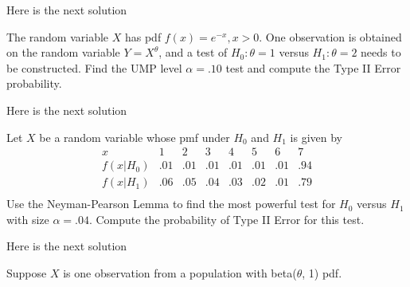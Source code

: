 \documentclass[12pt,letterpaper]{exam}
\begin{document}
\begin{questions}
	\begin{solution}
		Here is the next solution
	\end{solution}
	
	\setcounter{question}{19-1}
	
	\question 
	The random variable $X$ has pdf $f(x) = e^{-x}, x> 0$. 
	One observation is obtained on the random variable $Y = X^\theta$, 
	and a test of $H_0: \theta = 1$ versus $H_1: \theta = 2$ needs to be constructed. 
	Find the UMP level $\alpha = .10$ test and compute the Type II Error probability.

	\begin{solution}
		Here is the next solution
	\end{solution}
	
	\setcounter{question}{20-1}
	
	\question 
	Let $X$ be a random variable whose pmf under $H_0$ and $H_1$ is given by
	$$
	\begin{array}{cccccccc}
		x & 1 & 2 & 3 & 4 & 5 & 6 & 7 \\ \hline
		f(x|H_0) & .01 & .01 & .01 & .01 & .01 & .01 & .94 \\
		f(x|H_1) & .06 & .05 & .04 & .03 & .02 & .01 & .79 \\
	\end{array}
	$$
	Use the Neyman-Pearson Lemma to find the most powerful test for $H_0$ versus $H_1$ with size $\alpha = .04$. 
	Compute the probability of Type II Error for this test.

	\begin{solution}
		Here is the next solution
	\end{solution}
	
	\setcounter{question}{23-1}
	
	\question 
	Suppose $X$ is one observation from a population with beta($\theta$, 1) pdf.
\end{questions}
\end{document}
